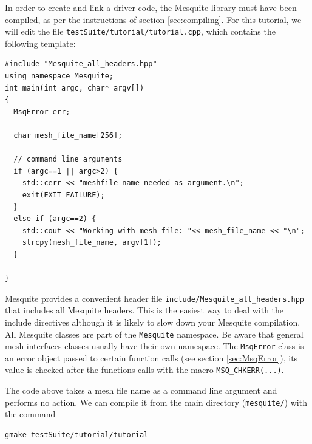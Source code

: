 \documentclass[letter]{report}
\begin{document}
In order to create and link a driver code, the Mesquite library must have been compiled, as per the
instructions of section \ref{sec:compiling}. For this tutorial, we will edit the file
\texttt{testSuite/tutorial/tutorial.cpp}, which contains the following template:
\begin{verbatim}
#include "Mesquite_all_headers.hpp"
using namespace Mesquite;
int main(int argc, char* argv[])
{
  MsqError err;
  
  char mesh_file_name[256];
  
  // command line arguments
  if (argc==1 || argc>2) {
    std::cerr << "meshfile name needed as argument.\n";
    exit(EXIT_FAILURE);
  }
  else if (argc==2) {
    std::cout << "Working with mesh file: "<< mesh_file_name << "\n";
    strcpy(mesh_file_name, argv[1]);
  } 
  
}
\end{verbatim}
Mesquite provides a convenient header file \texttt{include/Mesquite\_all\_headers.hpp} that includes
all Mesquite headers. This is the easiest way to deal with the include directives although it is likely to slow
down your Mesquite compilation.
All Mesquite classes are part of the \texttt{Mesquite} namespace. Be aware that general mesh interfaces
classes usually have their own namespace. The \texttt{MsqError} class is an error object passed to 
certain function calls (see section \ref{sec:MsqError}), its value is checked after the functions calls with
the macro \texttt{MSQ\_CHKERR(...)}.

The code above takes a mesh file name as a command line argument and performs no action. 
We can compile it from the main directory
(\texttt{mesquite/}) with the command 
\begin{verbatim}
gmake testSuite/tutorial/tutorial
\end{verbatim}
\end{document}
